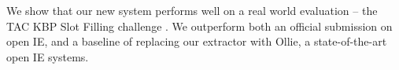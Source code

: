 We show that our new system performs well on a real world evaluation --
  the TAC KBP Slot Filling challenge \cite{key:2013surdeanu-kbpoverview}.
We outperform both an official submission on
  open IE, and a baseline of replacing our extractor with Ollie,
  a state-of-the-art open IE systems.

%


